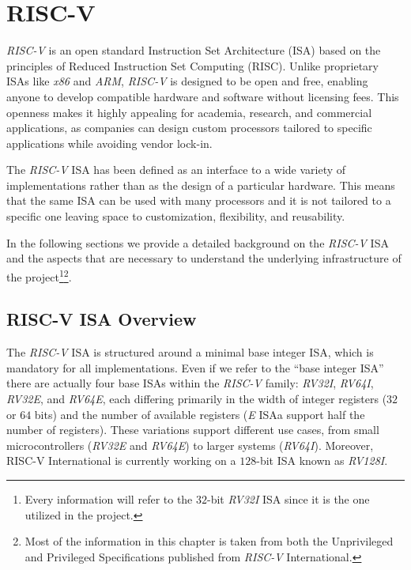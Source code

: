 \chapter{RISC-V}
\label{cha:riscv}

\textit{RISC-V} is an open standard Instruction Set Architecture (ISA) based on the
principles of Reduced Instruction Set Computing (RISC). Unlike proprietary ISAs
like \textit{x86} and \textit{ARM}, \textit{RISC-V} is designed to be open and
free, enabling anyone to develop compatible hardware and software without licensing
fees. This openness makes it highly appealing for academia, research, and
commercial applications, as companies can design custom processors tailored to specific
applications while avoiding vendor lock-in.

The \textit{RISC-V} ISA has been defined as an interface to a wide variety of
implementations rather than as the design of a particular hardware. This means that
the same ISA can be used with many processors and it is not tailored to a specific
one leaving space to customization, flexibility, and reusability.

In the following sections we provide a detailed background on the \textit{RISC-V}
ISA and the aspects that are necessary to understand the underlying
infrastructure of the project\footnote{Every information will refer to the $32$-bit
\textit{RV32I} ISA since it is the one utilized in the project.}\footnote{Most
of the information in this chapter is taken from both the Unprivileged and
Privileged Specifications\cite{specifications} published from \textit{RISC-V}
International.}.

\section{RISC-V ISA Overview}
\label{sec:riscv_isa}

The \textit{RISC-V} ISA is structured around a minimal base integer ISA, which is
mandatory for all implementations. Even if we refer to the ``base integer ISA''
there are actually four base ISAs within the \textit{RISC-V} family: \textit{RV32I},
\textit{RV64I}, \textit{RV32E}, and \textit{RV64E}, each differing primarily in
the width of integer registers ($32$ or $64$ bits) and the number of available
registers (\textit{E} ISAa support half the number of registers). These
variations support different use cases, from small microcontrollers (\textit{RV32E}
and \textit{RV64E}) to larger systems (\textit{RV64I}). Moreover, RISC-V
International is currently working on a $128$-bit ISA known as \textit{RV128I}.

